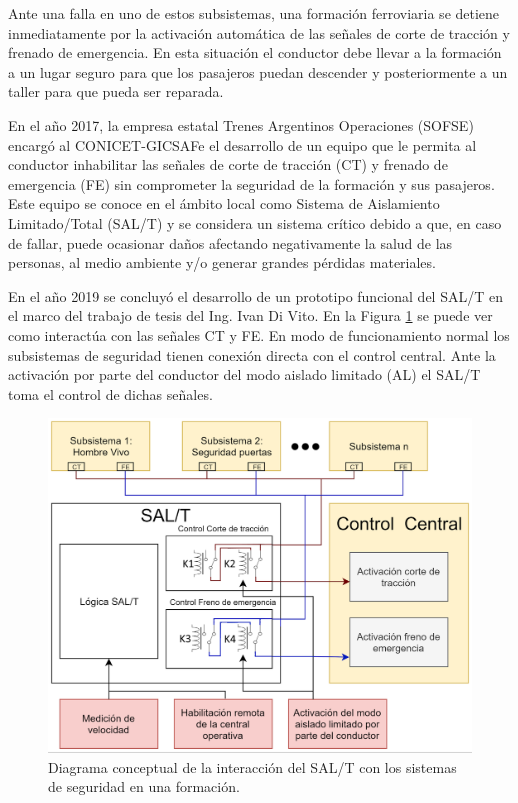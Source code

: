 \documentclass[11pt]{charter}
\begin{document}
Ante una falla en uno de estos subsistemas, una formación ferroviaria se detiene inmediatamente por la activación 
automática de las señales de corte de tracción y frenado de emergencia. En esta situación el conductor debe llevar a la 
formación a un lugar seguro para que los pasajeros puedan descender y posteriormente a un taller para que pueda ser 
reparada.

En el año 2017, la empresa estatal Trenes Argentinos Operaciones (SOFSE) encargó al CONICET-GICSAFe el desarrollo de un 
equipo que le permita al conductor inhabilitar las señales de corte de tracción (CT) y frenado de emergencia (FE) sin comprometer 
la seguridad de la formación y sus pasajeros. Este equipo se conoce en el ámbito local como Sistema de Aislamiento 
Limitado/Total (SAL/T) y se considera un sistema crítico debido a que, en caso de fallar, puede 
ocasionar daños afectando negativamente la salud de las personas, al medio ambiente y/o generar grandes pérdidas 
materiales.

En el año 2019 se concluyó el desarrollo de un prototipo funcional del SAL/T  en el marco del trabajo de tesis del Ing. 
Ivan Di Vito. En la Figura \ref{fig:diagrama_de_bloques} se puede ver como interactúa con las señales CT y FE. En modo 
de funcionamiento normal los subsistemas de seguridad tienen conexión directa con el control central. Ante la activación 
por parte del conductor del modo aislado limitado (AL) el SAL/T toma el control de dichas señales.

\begin{figure}[htpb]
\centering 
\includegraphics[width=.85\textwidth]{./Figuras/diagrama_de_bloques.png}
\caption{Diagrama conceptual de la interacción del SAL/T con los sistemas de seguridad en una formación.}
\label{fig:diagrama_de_bloques}
\end{figure}
\end{document}
